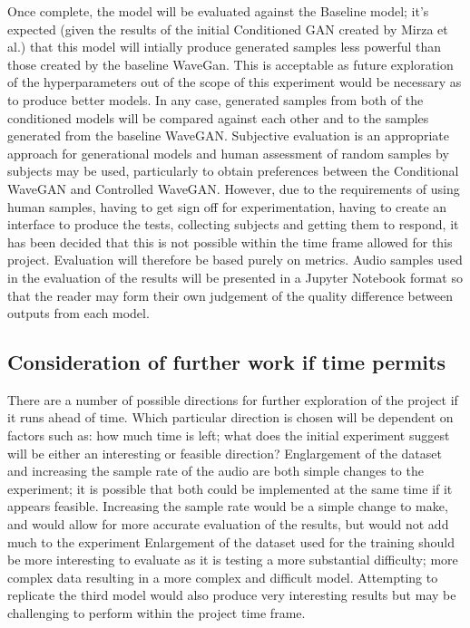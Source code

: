 \documentclass[a4paper, titlepage]{article}
\begin{document}
Once complete, the model will be evaluated against the Baseline model; it's expected (given the results of the initial Conditioned GAN created by Mirza et al.) that this model will intially produce generated samples less powerful than those created by the baseline WaveGan.
This is acceptable as future exploration of the hyperparameters out of the scope of this experiment would be necessary as to produce better models.
\newline
\newline
In any case, generated samples from both of the conditioned models will be compared against each other and to the samples generated from the baseline WaveGAN.
\newline
\newline
Subjective evaluation is an appropriate approach for generational models and human assessment of random samples by subjects may be used, particularly to obtain preferences between the Conditional WaveGAN and Controlled WaveGAN.
However, due to the requirements of using human samples, having to get sign off for experimentation, having to create an interface to produce the tests, collecting subjects and getting them to respond, it has been decided that this is not possible within the time frame allowed for this project.
Evaluation will therefore be based purely on metrics.
\newline
\newline
Audio samples used in the evaluation of the results will be presented in a Jupyter Notebook format so that the reader may form their own judgement of the quality difference between outputs from each model.

\subsection{Consideration of further work if time permits}

There are a number of possible directions for further exploration of the project if it runs ahead of time.
Which particular direction is chosen will be dependent on factors such as: how much time is left; what does the initial experiment suggest will be either an interesting or feasible direction?
Englargement of the dataset and increasing the sample rate of the audio are both simple changes to the experiment; it is possible that both could be implemented at the same time if it appears feasible.
Increasing the sample rate would be a simple change to make, and would allow for more accurate evaluation of the results, but would not add much to the experiment
Enlargement of the dataset used for the training should be more interesting to evaluate as it is testing a more substantial difficulty; more complex data resulting in a more complex and difficult model.
Attempting to replicate the third model would also produce very interesting results but may be challenging to perform within the project time frame.
\end{document}
